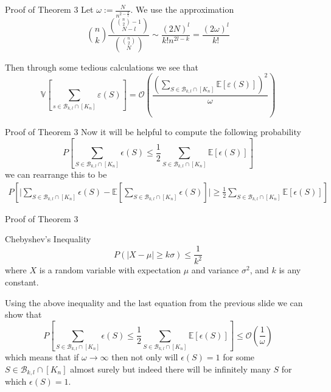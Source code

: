 \documentclass{beamer}
\begin{document}
\begin{frame}{Proof of Theorem 3}
	Let $\omega:=\frac{N}{n^{2-\frac{k}{l}}}$. We use the approximation 
	$${n\choose k}\frac{{{n\choose 2}-1\choose N-l}}{{{n\choose 2}\choose N}}\sim \frac{(2N)^l}{k!n^{2l-k}}=\frac{(2\omega)^l}{k!}$$
	
	Then through some tedious calculations we see that
	$$\mathbb{V}\left[\sum_{s\in\mathcal{B}_{k,l}\cap [K_n]}\varepsilon(S)\right]=\mathcal{O}\left(\frac{\left(\sum_{S\in \mathcal{B}_{k,l}\cap [K_n]}\mathbb{E}\left[\varepsilon(S)\right]\right)^2}{\omega}\right)$$
\end{frame}

\begin{frame}{Proof of Theorem 3}
	Now it will be helpful to compute the following probability
	\begin{equation}
			P\left[\sum_{S\in \mathcal{B}_{k,l}\cap [K_n]}\epsilon(S)\leq \frac{1}{2}\sum_{S\in \mathcal{B}_{k,l}\cap [K_n]}\mathbb{E}[\epsilon(S)]\right]
	\end{equation}
	we can rearrange this to be 
	\begin{equation} 
	\begin{split} 
		P\left[\bigg|\sum_{S\in \mathcal{B}_{k,l}\cap [K_n]}\epsilon(S)-\mathbb{E}\left[\sum_{S\in \mathcal{B}_{k,l}\cap [K_n]}\epsilon(S)\right]\bigg|\geq \frac{1}{2}\sum_{S\in \mathcal{B}_{k,l}\cap [K_n]}\mathbb{E}\left[\epsilon(S)\right]\right]
	\end{split}
\end{equation}
\end{frame}
\begin{frame}{Proof of Theorem 3}
	\begin{block}{Chebyshev's Inequality}
		$$P(|X-\mu|\geq k\sigma)\leq \frac{1}{k^2}$$
		where $X$ is a random variable with expectation $\mu$ and variance $\sigma^2$, and $k$ is any constant.
	\end{block}
	Using the above inequality and the last equation from the previous slide we can show that
	\begin{equation}
			P\left[\sum_{S\in \mathcal{B}_{k,l}\cap [K_n]}\epsilon(S)\leq \frac{1}{2}\sum_{S\in \mathcal{B}_{k,l}\cap [K_n]}\mathbb{E}[\epsilon(S)]\right]\leq\mathcal{O}(\frac{1}{\omega})
	\end{equation}
	which means that if $\omega \rightarrow \infty$  then not only will $\epsilon(S)=1$ for some $S\in \mathcal{B}_{k,l}\cap [K_n]$ almost surely but indeed there will be infinitely many $S$ for which $\epsilon(S)=1$.
\end{frame}
\end{document}
